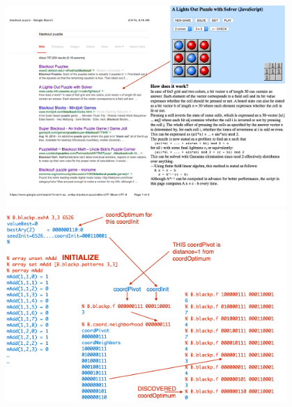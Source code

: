 \begin{figure}[t!]

\centering
\vspace*{-5ex}%

\begin{minipage}{0.49\textwidth}
\includegraphics[width=0.95\textwidth]{fg-key-blackp-descr-a}
\vspace*{+2ex}%
\end{minipage}
\begin{minipage}{0.49\textwidth}
\includegraphics[width=0.95\textwidth]{fg-key-blackp-neighbors}
\vspace*{+2ex}%
\end{minipage}
~%
\begin{minipage}{0.49\textwidth}

\end{minipage}
\end{figure}
